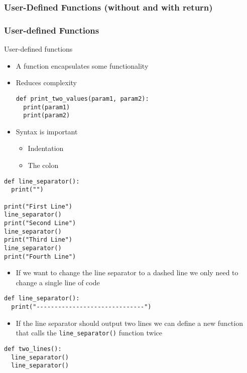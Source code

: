 \documentclass[10pt, a4paper]{beamer} %
\begin{document}
\subsubsection{User-Defined Functions (without and with return)} %
\begin{frame}\frametitle{User-defined Functions}
	\begin{block}{User-defined functions}
		\begin{itemize}
			\item A function encapsulates some functionality
			\item Reduces complexity
			      \begin{lstlisting}
def print_two_values(param1, param2):
  print(param1)
  print(param2)
    \end{lstlisting}
			\item Syntax is important
			      \begin{itemize}
				      \item Indentation
				      \item The colon
			      \end{itemize}
		\end{itemize}
	\end{block}
	\framebreak
	\begin{examples}
		\begin{lstlisting}
def line_separator():
  print("")

print("First Line")
line_separator()
print("Second Line")
line_separator()
print("Third Line")
line_separator()
print("Fourth Line")
\end{lstlisting}
	\end{examples}
	\begin{itemize}
		\item If we want to change the line separator to a dashed line we only need to change a single line of code
	\end{itemize}
	\begin{lstlisting}
def line_separator():
  print("------------------------------")
\end{lstlisting}


	\framebreak

	\begin{examples}
		\begin{itemize}
			\item If the line separator should output two lines we can define a new function that calls the \lstinline!line_separator()! function twice
		\end{itemize}
		\begin{lstlisting}
def two_lines():
  line_separator()
  line_separator()


\end{lstlisting}
\end{examples}
\end{frame}
\end{document}
